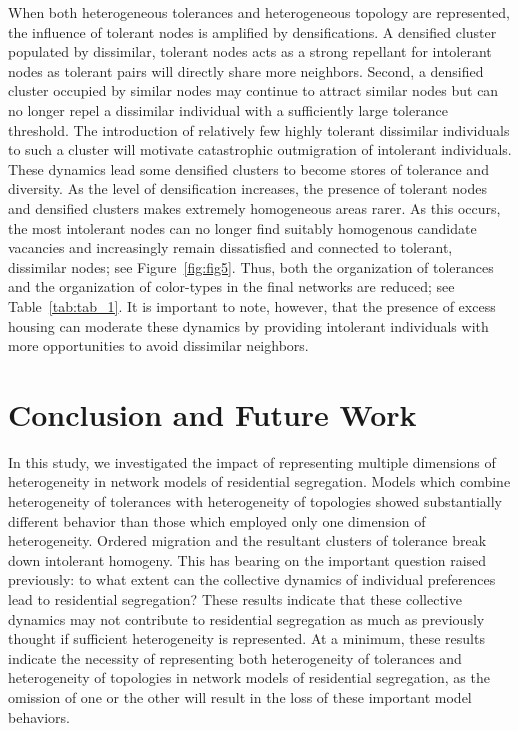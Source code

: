 \documentclass[a4paper]{article}
\begin{document}
When both heterogeneous tolerances and heterogeneous topology are represented, the influence of tolerant nodes is amplified by densifications. A densified cluster populated by dissimilar, tolerant nodes acts as a strong repellant for intolerant nodes as tolerant pairs will directly share more neighbors. Second, a densified cluster occupied by similar nodes may continue to attract similar nodes but can no longer repel a dissimilar individual with a sufficiently large tolerance threshold. The introduction of relatively few highly tolerant dissimilar individuals to such a cluster will motivate catastrophic outmigration of intolerant individuals. These dynamics lead some densified clusters to become stores of tolerance and diversity. As the level of densification increases, the presence of tolerant nodes and densified clusters makes extremely homogeneous areas rarer. As this occurs, the most intolerant nodes can no longer find suitably homogenous candidate vacancies and increasingly remain dissatisfied and connected to tolerant, dissimilar nodes; see Figure~\ref{fig:fig5}. Thus, both the organization of tolerances and the organization of color-types in the final networks are reduced; see Table~\ref*{tab:tab_1}. It is important to note, however, that the presence of excess housing can moderate these dynamics by providing intolerant individuals with more opportunities to avoid dissimilar neighbors.

\section{Conclusion and Future Work}
In this study, we investigated the impact of representing multiple dimensions of heterogeneity in network models of residential segregation. Models which combine heterogeneity of tolerances with heterogeneity of topologies showed substantially different behavior than those which employed only one dimension of heterogeneity.  Ordered migration and the resultant clusters of tolerance break down intolerant homogeny. This has bearing on the important question raised previously: to what extent can the collective dynamics of individual preferences lead to residential segregation?  These results indicate that these collective dynamics may not contribute to residential segregation as much as previously thought if sufficient heterogeneity is represented.  At a minimum, these results indicate the necessity of representing both heterogeneity of tolerances and heterogeneity of topologies in network models of residential segregation, as the omission of one or the other will result in the loss of these important model behaviors.  
\end{document}
